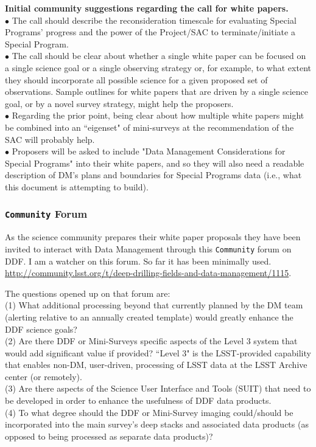 \documentclass[DM,lsstdraft,toc]{lsstdoc}
\begin{document}
\textbf{Initial community suggestions regarding the call for white papers.} \\
$\bullet$ The call should describe the reconsideration timescale for evaluating Special Programs' progress and the power of the Project/SAC to terminate/initiate a Special Program. \\
$\bullet$ The call should be clear about whether a single white paper can be focused on a single science goal or a single observing strategy or, for example, to what extent they should incorporate all possible science for a given proposed set of observations. Sample outlines for white papers that are driven by a single science goal, or by a novel survey strategy, might help the proposers. \\
$\bullet$ Regarding the prior point, being clear about how multiple white papers might be combined into an ``eigenset" of mini-surveys at the recommendation of the SAC will probably help. \\
$\bullet$ Proposers will be asked to include "Data Management Considerations for Special Programs" into their white papers, and so they will also need a readable description of DM's plans and boundaries for Special Programs data (i.e., what this document is attempting to build).

\subsubsection{{\tt \Large{Community}} Forum}\label{sssec:data_comm_forum}

As the science community prepares their white paper proposals they have been invited to interact with Data Management through this {\tt \Large{Community}} forum on DDF. I am a watcher on this forum. So far it has been minimally used. \\ \url{http://community.lsst.org/t/deep-drilling-fields-and-data-management/1115}. 

\noindent The questions opened up on that forum are: \\
(1) What additional processing beyond that currently planned by the DM team (alerting relative to an annually created template) would greatly enhance the DDF science goals? \\
(2) Are there DDF or Mini-Surveys specific aspects of the Level 3 system that would add significant value if provided? ``Level 3" is the LSST-provided capability that enables non-DM, user-driven, processing of LSST data at the LSST Archive center (or remotely). \\
(3) Are there aspects of the Science User Interface and Tools (SUIT) that need to be developed in order to enhance the usefulness of DDF data products. \\
(4) To what degree should the DDF or Mini-Survey imaging could/should be incorporated into the main survey's deep stacks and associated data products (as opposed to being processed as separate data products)?
\end{document}
